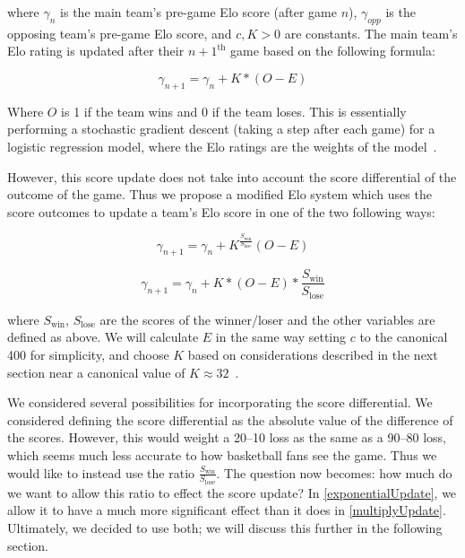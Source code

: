 \documentclass{article}
\begin{document}
where $\gamma_n$ is the main team's pre-game Elo score (after game $n$), $\gamma_{opp}$ is the opposing team's pre-game Elo score, and $c, K > 0$ are constants. The main team's Elo rating is updated after their $n+1^{\text{th}}$ game based on the following formula:

\begin{equation}
\gamma_{n+1} = \gamma_n + K*(O - E)
\end{equation}


Where $O$ is 1 if the team wins and 0 if the team loses. This is essentially performing a stochastic gradient descent (taking a step after each game) for a logistic regression model, where the Elo ratings are the weights of the model~\cite{stmorseStatisticalLearning}.

However, this score update does not take into account the score differential of the outcome of the game. Thus we propose a modified Elo system which uses the score outcomes to update a team's Elo score in one of the two following ways: 

\begin{equation}
\label{exponentialUpdate}
\gamma_{n+1} = \gamma_n + K^{\frac{S_{\text{win}}}{S_{\text{lose}}}}(O - E)
\end{equation}


\begin{equation}
\label{multiplyUpdate}
\gamma_{n+1} = \gamma_n + K*(O - E)*\frac{S_{\text{win}}}{S_{\text{lose}}}
\end{equation}


where $S_{\text{win}}$, $S_{\text{lose}}$ are the scores of the winner/loser and the other variables are defined as above. We will calculate $E$ in the same way setting $c$ to the canonical 400 for simplicity, and choose $K$ based on considerations described in the next section near a canonical value  of $K\approx 32$~\cite{mediumRatingSystem}.

We considered several possibilities for incorporating the score differential. We considered defining the score differential as the absolute value of the difference of the scores. However, this would weight a 20--10 loss as the same as a 90--80 loss, which seems much less accurate to how basketball fans see the game. Thus we would like to instead use the ratio $\frac{S_{\text{win}}}{S_{\text{lose}}}$. The question now becomes: how much do we want to allow this ratio to effect the score update? In \autoref{exponentialUpdate}, we allow it to have a much more significant effect than it does in \autoref{multiplyUpdate}. Ultimately, we decided to use both; we will discuss this further in the following section.
\end{document}
